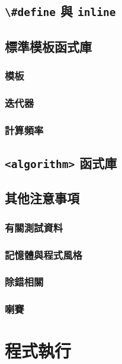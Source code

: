 \documentclass[12pt,a4paper,oneside]{report}
\begin{document}
\begin{CJK}{UTF8}{bkai}
\subsection{\lstinline!\#define! 與 \lstinline!inline!}

\subsection{標準模板函式庫}

\subsubsection{模板}

\subsubsection{迭代器}

\subsubsection{計算頻率}

\subsection{\lstinline!<algorithm>! 函式庫}

\subsection{其他注意事項}

\subsubsection{有關測試資料}

\subsubsection{記憶體與程式風格}

\subsubsection{除錯相關}

\subsubsection{喇賽}

\section{程式執行}


\end{CJK}
\end{document}
